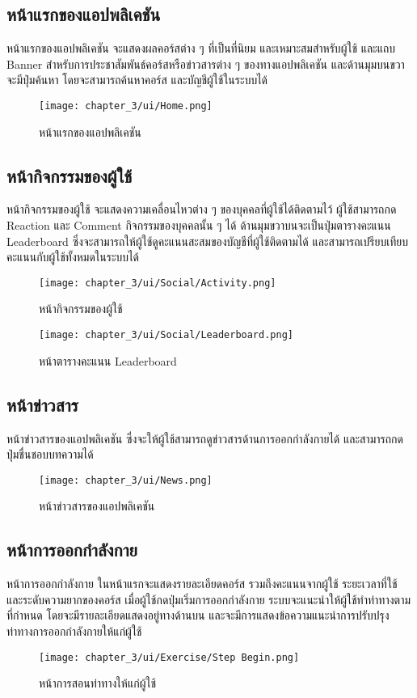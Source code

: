 \subsection{หน้าแรกของแอปพลิเคชัน}
หน้าแรกของแอปพลิเคชัน จะแสดงผลคอร์สต่าง ๆ ที่เป็นที่นิยม และเหมาะสมสำหรับผู้ใช้ และแถบ Banner สำหรับการประชาสัมพันธ์คอร์สหรือข่าวสารต่าง ๆ ของทางแอปพลิเคชัน และด้านมุมบนขวาจะมีปุ่มค้นหา โดยจะสามารถค้นหาคอร์ส และบัญชีผู้ใช้ในระบบได้
\begin{figure}
    \texttt{[image: chapter\_3/ui/Home.png]}
    \caption{หน้าแรกของแอปพลิเคชัน}
\end{figure}

\subsection{หน้ากิจกรรมของผู้ใช้}
หน้ากิจกรรมของผู้ใช้ จะแสดงความเคลื่อนไหวต่าง ๆ ของบุคคลที่ผู้ใช้ได้ติดตามไว้ ผู้ใช้สามารถกด Reaction และ Comment กิจกรรมของบุคคลนั้น ๆ ได้ ด้านมุมขวาบนจะเป็นปุ่มตารางคะแนน Leaderboard ซึ่งจะสามารถให้ผู้ใช้ดูคะแนนสะสมของบัญชีที่ผู้ใช้ติดตามได้ และสามารถเปรียบเทียบคะแนนกับผู้ใช้ทั้งหมดในระบบได้
\begin{figure}
    \texttt{[image: chapter\_3/ui/Social/Activity.png]}
    \caption{หน้ากิจกรรมของผู้ใช้}
\end{figure}
\begin{figure}
    \texttt{[image: chapter\_3/ui/Social/Leaderboard.png]}
    \caption{หน้าตารางคะแนน Leaderboard}
\end{figure}

\subsection{หน้าข่าวสาร}
หน้าข่าวสารของแอปพลิเคชัน ซึ่งจะให้ผู้ใช้สามารถดูข่าวสารด้านการออกกำลังกายได้ และสามารถกดปุ่มชื่นชอบบทความได้
\begin{figure}
    \texttt{[image: chapter\_3/ui/News.png]}
    \caption{หน้าข่าวสารของแอปพลิเคชัน}
\end{figure}

\subsection{หน้าการออกกำลังกาย}
หน้าการออกกำลังกาย ในหน้าแรกจะแสดงรายละเอียดคอร์ส รวมถึงคะแนนจากผู้ใช้ ระยะเวลาที่ใช้ และระดับความยากของคอร์ส เมื่อผู้ใช้กดปุ่มเริ่มการออกกำลังกาย ระบบจะแนะนำให้ผู้ใช้ทำท่าทางตามที่กำหนด โดยจะมีรายละเอียดแสดงอยู่ทางด้านบน และจะมีการแสดงข้อความแนะนำการปรับปรุงท่าทางการออกกำลังกายให้แก่ผู้ใช้
\begin{figure}
    \texttt{[image: chapter\_3/ui/Exercise/Step Begin.png]}
    \caption{หน้าการสอนท่าทางให้แก่ผู้ใช้}
\end{figure}

